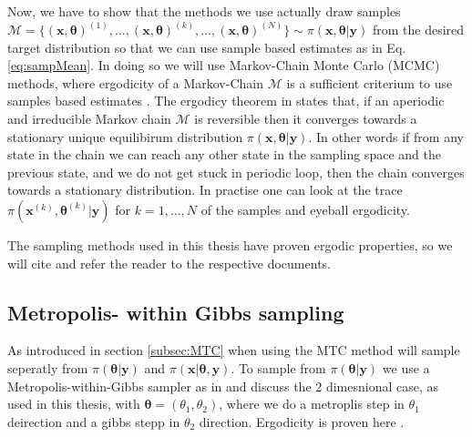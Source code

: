 Now, we have to show that the methods we use actually draw samples $ \mathcal{M} = \{ (\bm{x}, \bm{\theta} )^{(1)}, \dots, (\bm{x}, \bm{\theta} )^{(k)} , \dots,  (\bm{x}, \bm{\theta})^{(N)} \} \sim \pi(\bm{x},\bm{\theta}| \bm{y}) $ from the desired target distribution so that we can use sample based estimates as in Eq. \ref{eq:sampMean}.
In doing so we will use Markov-Chain Monte Carlo (MCMC) methods, where ergodicity of a Markov-Chain $\mathcal{M}$ is a sufficient criterium to use samples based estimates \cite{tan2016LecNot, roberts2004general}.
The ergodicy theorem in \cite{tan2016LecNot} states that, if an aperiodic and irreducible Markov chain $\mathcal{M}$ is reversible then it converges towards a stationary unique equilibirum distribution $\pi(\bm{x},\bm{\theta}| \bm{y}) $.
In other words if from any state in the chain we can reach any other state in the sampling space and the previous state, and we do not get stuck in periodic loop, then the chain converges towards a stationary distribution.
In practise one can look at the trace $\pi(\bm{x}^{(k)},\bm{\theta}^{(k)}| \bm{y}) $ for $k = 1, \dots, N$ of the samples and eyeball ergodicity.

The sampling methods used in this thesis have proven ergodic properties, so we will cite and refer the reader to the respective documents.

\subsection{Metropolis- within Gibbs sampling}

As introduced in section \ref{subsec:MTC} when using the MTC method will sample seperatly from $\pi(\bm{\theta}| \bm{y})$ and $\pi(\bm{x}|\bm{\theta}, \bm{y}) $.
To sample from $\pi(\bm{\theta}| \bm{y})$ we use a Metropolis-within-Gibbs sampler as in \cite{fox2016fast} and discuss the 2 dimesnional case, as used in this thesis, with $\bm{\theta}  =( \theta_1 , \theta_2) $, where we do a metroplis step in $\theta_1$ deirection and a gibbs stepp in $\theta_2$ direction.
Ergodicity is proven here \cite{roberts2006harris}.

